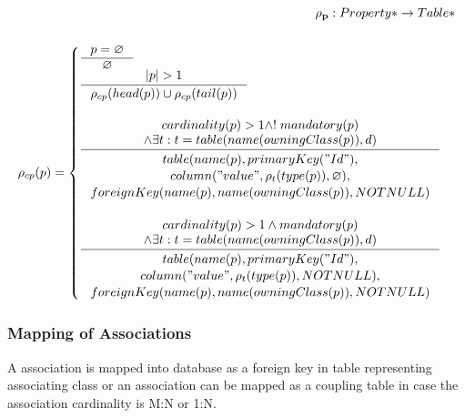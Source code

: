 \documentclass[11pt]{article}
\begin{document}
\begin{align*}
	\mathbf{\rho_p} : Property* \rightarrow Table* \\ \\
	\rho_{cp}(p) = \begin{cases}
		\inference{p = \varnothing}{\varnothing}\\
		\inference{|p| > 1}{\rho_{cp}(head(p)) \cup \rho_{cp}(tail(p))}\\\\
     	\inference{cardinality(p) > 1 \wedge !\;mandatory(p) \\ 
     		\wedge 	\exists t : t = table(name(owningClass(p)), d)
     		}{\begin{gathered}
     			table(name(p), primaryKey("Id"), \\ column("value", 			\rho_t(type(p)), \varnothing), \\ foreignKey(name(p), 			name(owningClass(p)), NOTNULL) \\
    	\end{gathered}}\\ \\
     	\inference{ cardinality(p) > 1 \wedge mandatory(p) \\ 
     		\wedge \exists t : t = table(name(owningClass(p)), d) 
     		}{\begin{gathered}  
     			table(name(p), primaryKey("Id"), \\ 
     			column("value", \rho_t(type(p)), NOTNULL), \\ 			foreignKey(name(p), name(owningClass(p)), NOTNULL)
    	 \end{gathered}}
 	\end{cases}
\end{align*}

\subsubsection{Mapping of Associations}
A association is mapped into database as a foreign key in table representing associating class or an association can be mapped as a coupling table in case the association cardinality is M:N or 1:N.
\end{document}
